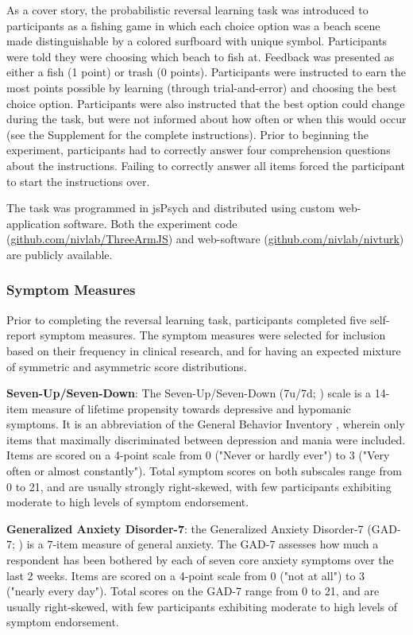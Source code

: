 \documentclass[a4paper,notitlepage,12pt]{article}
\begin{document}
As a cover story, the probabilistic reversal learning task was introduced to participants as a fishing game in which each choice option was a beach scene made distinguishable by a colored surfboard with unique symbol. Participants were told they were choosing which beach to fish at. Feedback was presented as either a fish (1 point) or trash (0 points). Participants were instructed to earn the most points possible by learning (through trial-and-error) and choosing the best choice option. Participants were also instructed that the best option could change during the task, but were not informed about how often or when this would occur (see the Supplement for the complete instructions). Prior to beginning the experiment, participants had to correctly answer four comprehension questions about the instructions. Failing to correctly answer all items forced the participant to start the instructions over.

The task was programmed in jsPsych \cite{deleeuw_2015_jspsych} and distributed using custom web-application software. Both the experiment code (\url{github.com/nivlab/ThreeArmJS}) and web-software (\url{github.com/nivlab/nivturk}) are publicly available.

\subsubsection{Symptom Measures}

Prior to completing the reversal learning task, participants completed five self-report symptom measures. The symptom measures were selected for inclusion based on their frequency in clinical research, and for having an expected mixture of symmetric and asymmetric score distributions. 

\textbf{Seven-Up/Seven-Down}: The Seven-Up/Seven-Down (7u/7d; \cite{youngstrom_2013_susd}) scale is a 14-item measure of lifetime propensity towards depressive and hypomanic symptoms. It is an abbreviation of the General Behavior Inventory \cite{depue1981behavioral}, wherein only items that maximally discriminated between depression and mania were included. Items are scored on a 4-point scale from 0 ("Never or hardly ever") to 3 ("Very often or almost constantly"). Total symptom scores on both subscales range from 0 to 21, and are usually strongly right-skewed, with few participants exhibiting moderate to high levels of symptom endorsement. 

\textbf{Generalized Anxiety Disorder-7}: the Generalized Anxiety Disorder-7 (GAD-7; \cite{spitzer2006brief}) is a 7-item measure of general anxiety. The GAD-7 assesses how much a respondent has been bothered by each of seven core anxiety symptoms over the last 2 weeks. Items are scored on a 4-point scale from 0 ("not at all") to 3 ("nearly every day"). Total scores on the GAD-7 range from 0 to 21, and are usually right-skewed, with few participants exhibiting moderate to high levels of symptom endorsement.
\end{document}
